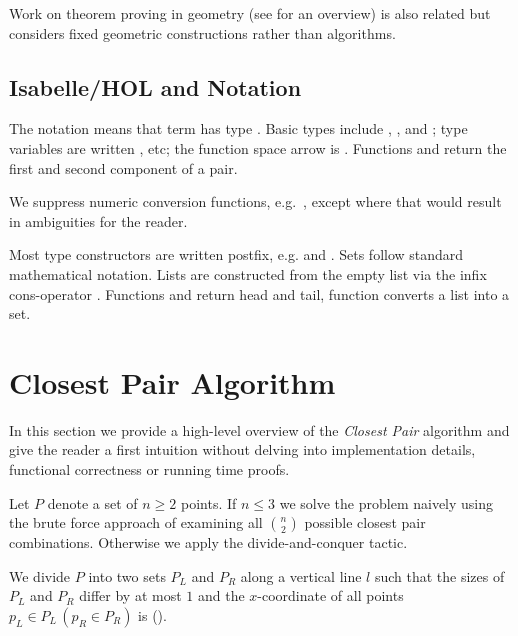 \begin{isabellebody}
\begin{isamarkuptext}
Work on theorem proving in geometry (see \cite{narboux:hal-01779452} for an overview)
is also related but considers fixed geometric constructions rather than algorithms.

\subsection{Isabelle/HOL and Notation}

The notation  means that term  has type \isa{{\isasymtau}}.
Basic types include , ,  and ; type variables are written ,  etc; the function space arrow is \isa{{\isasymRightarrow}}. Functions  and  return
the first and second component of a pair.

We suppress numeric conversion functions, e.g.\ , except where that would result in ambiguities for the reader.

Most type constructors are written postfix, e.g.  and .
Sets follow standard mathematical notation.
Lists are constructed from the empty list \isa{{\isacharbrackleft}{\isacharbrackright}} via the infix cons-operator \isa{{\isacharparenleft}{\isacharhash}{\isacharparenright}}. Functions  and  return head and tail, function 
converts a list into a set.


\section{Closest Pair Algorithm} \label{section:closest_pair_algorithm}

In this section we provide a high-level overview of the \textit{Closest Pair} algorithm and give
the reader a first intuition without delving into implementation details, functional correctness
or running time proofs.

Let $P$ denote a set of $n \ge 2$ points. If $n \le 3$ we solve the problem
naively using the brute force approach of examining all $n \choose 2$ possible closest pair
combinations. Otherwise we apply the divide-and-conquer tactic.

We divide $P$ into two sets $P_L$ and $P_R$ along a vertical
line $l$ such that the sizes of $P_L$ and $P_R$ differ by at most $1$ and the
$x$-coordinate of all points \mbox{$p_L \in P_L\,(p_R \in P_R)$} is 
().


\end{isamarkuptext}
\end{isabellebody}
